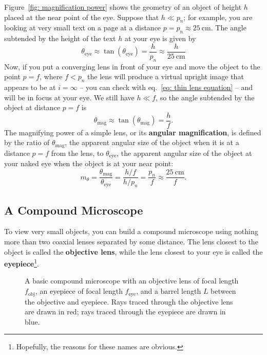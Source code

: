 \documentclass[addpoints]{physlabs}
\begin{document}
\begin{labsection}
\begin{theory}
    Figure~\ref{fig: magnification power} shows the geometry of an object of height $h$ placed at the near point of the eye. Suppose that $h\ll p_n$; for example, you are looking at very small text on a page at a distance $p=p_n\approx\qty{25}{\centi\meter}$. The angle subtended by the height of the text $h$ at your eye is given by
    \begin{equation}\label{eq: max eye angle}
        \theta_\text{eye} \approx \tan{(\theta_\text{eye})} = \frac{h}{p_n} \approx \frac{h}{\qty{25}{\centi\meter}}
    \end{equation}
    Now, if you put a converging lens in front of your eye and move the object to the point $p=f$, where $f<p_n$ the lens will produce a virtual upright image that appears to be at $i=\infty$ -- you can check with eq.~\ref{eq: thin lens equation} -- and will be in focus at your eye. We still have $h\ll f$, so the angle subtended by the object at distance $p=f$ is
    \begin{equation}\label{eq: max mag angle}
        \theta_\text{mag} \approx \tan{(\theta_\text{mag})} = \frac{h}{f}.
    \end{equation}
    The magnifying power of a simple lens, or its \textbf{angular magnification}, is defined by the ratio of $\theta_\text{mag}$, the apparent angular size of the object when it is at a distance $p=f$ from the lens, to $\theta_\text{eye}$, the apparent angular size of the object at your naked eye when the object is at your near point:
    \begin{equation}\label{eq: angular magnification}
        m_\theta = \frac{\theta_\text{mag}}{\theta_\text{eye}} = \frac{h/f}{h/p_n} = \frac{p_n}{f} \approx \frac{\qty{25}{\centi\meter}}{f}.
    \end{equation}

    \subsection*{A Compound Microscope}

    To view very small objects, you can build a compound microscope using nothing more than two coaxial lenses separated by some distance. The lens closest to the object is called the \textbf{objective lens}, while the lens closest to your eye is called the \textbf{eyepiece}\footnote{Hopefully, the reasons for these names are obvious.}.

    \begin{figure}[ht]
        \centering
        
        \caption{A basic compound microscope with an objective lens of focal length $f_\text{obj}$, an eyepiece of focal length $f_\text{eye}$, and a barrel length $L$ between the objective and eyepiece. Rays traced through the objective lens are drawn in red; rays traced through the eyepiece are drawn in blue.}
        \label{fig: compound microscope}
    \end{figure}


\end{theory}
\end{labsection}
\end{document}
